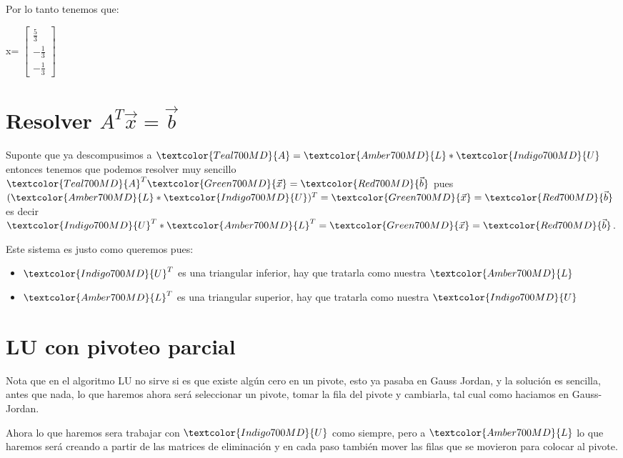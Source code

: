 \documentclass[12pt, fleqn]{report}                             %
\def \Eq {equation}                                             %
\newenvironment{MultiLineEquation*}[1]                          %
        {\begin{\Eq*}\begin{alignedat}{#1}}                         %
        {\end{alignedat}\end{\Eq*}}                                 %
\newcommand \Quote              {\qq}                           %
\theoremstyle{break}                                            %
\newcommand{\bVector}[1]                                        %
        { \ensuremath{\begin{bmatrix}#1\end{bmatrix}} }             %
\newcommand{\Color}[2]{\textcolor{#1}{#2}}                      %
\newcommand \ColorMatrixA       {Teal700MD}                     %
\newcommand \ColorVecX          {Green700MD}                    %
\newcommand \ColorVecB          {Red700MD}                      %
\newcommand \ColorMatrixL       {Amber700MD}                    %
\newcommand \ColorMatrixU       {Indigo700MD}                   %
\newcommand \MatrixA      {\Color{\ColorMatrixA}{A}}            %
\newcommand \VecX         {\Color{\ColorVecX}{\vec x}}          %
\newcommand \VecB         {\Color{\ColorVecB}{\vec b}}          %
\newcommand \MatrixL      {\Color{\ColorMatrixL}{L}}            %
\newcommand \MatrixU      {\Color{\ColorMatrixU}{U}}            %
\begin{document}
            Por lo tanto tenemos que:
            \begin{MultiLineEquation*}{3}
                \VecX = \bVector{
                    \frac{5}{3} \\ -\frac{1}{3} \\ -\frac{1}{3}
                }
            \end{MultiLineEquation*}


        \clearpage
        \section{Resolver $A^T \vec x = \vec b$}
            
            Suponte que ya descompusimos a $\MatrixA = \MatrixL * \MatrixU$
            entonces tenemos que podemos resolver muy sencillo 
            $\MatrixA^T \VecX = \VecB$ pues $(\MatrixL * \MatrixU)^T = \VecX = \VecB$
            es decir $\MatrixU^T * \MatrixL^T = \VecX = \VecB$.

            Este sistema es justo como queremos pues:
            \begin{itemize}
                \item $\MatrixU^T$ es una triangular inferior, hay que tratarla como nuestra $\MatrixL$
                \item $\MatrixL^T$ es una triangular superior, hay que tratarla como nuestra $\MatrixU$
            \end{itemize}

        \vspace{2em}
        \section{LU con pivoteo parcial}

            Nota que en el algoritmo \Quote{puro} LU no sirve si es que existe algún cero en un pivote, 
            esto ya pasaba en Gauss Jordan, y la solución es sencilla, antes que nada, lo que haremos ahora
            será seleccionar un pivote, tomar la fila del pivote y cambiarla, tal cual como haciamos en Gauss-Jordan.

            Ahora lo que haremos sera trabajar con $\MatrixU$ como siempre, pero a $\MatrixL$ lo que haremos
            será creando a partir de las matrices de eliminación y en cada paso también mover las filas que 
            se movieron para colocar al pivote.
\end{document}
